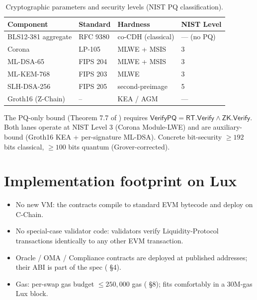 \documentclass[11pt]{article}
\begin{document}
\begin{table}[h]
\centering
\caption{Cryptographic parameters and security levels (NIST PQ
classification).}
\begin{tabular}{llll}
\toprule
Component & Standard & Hardness & NIST Level \\
\midrule
BLS12-381 aggregate & RFC 9380     & co-CDH (classical)  & --- (no PQ)\\
Corona              & LP-105       & MLWE + MSIS         & 3 \\
ML-DSA-65             & FIPS 204     & MLWE + MSIS         & 3 \\
ML-KEM-768            & FIPS 203     & MLWE                & 3 \\
SLH-DSA-256           & FIPS 205     & second-preimage     & 5 \\
Groth16 (Z-Chain)     & --           & KEA / AGM           & --- \\
\bottomrule
\end{tabular}
\end{table}

The PQ-only bound (Theorem 7.7 of \cite{quasar-cert}) requires
$\mathsf{VerifyPQ} = \mathsf{RT.Verify} \land \mathsf{ZK.Verify}$.
Both lanes operate at NIST Level 3 (Corona Module-LWE) and are
auxiliary-bound (Groth16 KEA + per-signature ML-DSA).
Concrete bit-security $\geq 192$ bits classical, $\geq 100$ bits
quantum (Grover-corrected).

\section{Implementation footprint on Lux}
\label{sec:impl}

\begin{itemize}[nosep]
  \item No new VM: the  contracts compile to
        standard EVM bytecode and deploy on C-Chain.
  \item No special-case validator code: validators verify
        Liquidity-Protocol transactions identically to any other
        EVM transaction.
  \item Oracle / OMA / Compliance contracts are deployed at
        published addresses; their ABI is part of the
         spec (\cite{lp-paper} \S4).
  \item Gas: per-swap gas budget $\leq 250{,}000$ gas
        (\cite{lp-paper} \S8); fits comfortably in a 30M-gas Lux
        block.
\end{itemize}
\end{document}
